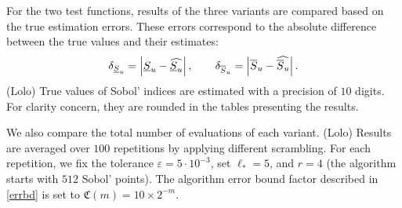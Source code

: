 For the two test functions, results of the three variants are compared based on the true estimation errors. These errors correspond to the absolute difference between the true values and their estimates:
$$\delta_{\underline{S}_u} = \left\lvert\underline{S}_u - \widehat{\underline{S}_u}\right\rvert, \qquad \delta_{\overline{S}_u} = \left\lvert\overline{S}_u - \widehat{\overline{S}_u}\right\rvert.$$
{\color{purple} (Lolo) True values of Sobol' indices are estimated with a precision of $10$ digits. For clarity concern, they are rounded in the tables presenting the results.}  

We also compare the total number of evaluations of each variant. {\color{purple} (Lolo) Results are averaged over $100$ repetitions by applying different scrambling}. For each repetition, we fix the tolerance $\varepsilon=5\cdot10^{-3}$, set $\ell_*=5$, and $r=4$ (the algorithm starts with $512$ Sobol' points). The algorithm error bound factor described in \eqref{errbd} is set to $\mathfrak{C}(m)=10\times 2^{-m}$.




%


